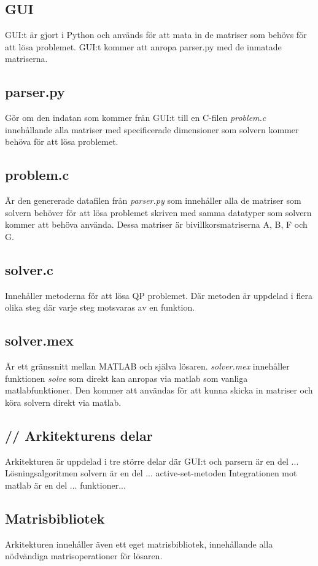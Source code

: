 \subsection{GUI}
GUI:t är gjort i Python och används för att mata in de matriser som behövs för att lösa problemet. GUI:t kommer att anropa parser.py med de inmatade matriserna.

\subsection{parser.py}
Gör om den indatan som kommer från GUI:t till en C-filen \textit{problem.c} innehållande alla matriser med specificerade dimensioner som solvern kommer behöva för att lösa problemet.

\subsection{problem.c}
Är den genererade datafilen från \textit{parser.py} som innehåller alla de matriser som solvern behöver för att lösa problemet skriven med samma datatyper som solvern kommer att behöva använda. Dessa matriser är bivillkorsmatriserna A, B, F och G.  

\subsection{solver.c}
Innehåller metoderna för att lösa QP problemet. Där metoden är uppdelad i flera olika steg där varje steg motsvaras av en funktion.

\subsection{solver.mex}
Är ett gränssnitt mellan MATLAB och själva lösaren. \textit{solver.mex} innehåller funktionen \textit{solve} som direkt kan anropas via matlab som vanliga matlabfunktioner. Den kommer att användas för att kunna skicka in matriser och köra solvern direkt via matlab.

\subsection{// Arkitekturens delar}
Arkitekturen är uppdelad i tre större delar där GUI:t och parsern är en del ...
Lösningsalgoritmen solvern är en del ... active-set-metoden
Integrationen mot matlab är en del ... funktioner...

\subsection{Matrisbibliotek}
Arkitekturen innehåller även ett eget matrisbibliotek, innehållande alla nödvändiga matrisoperationer för lösaren.


